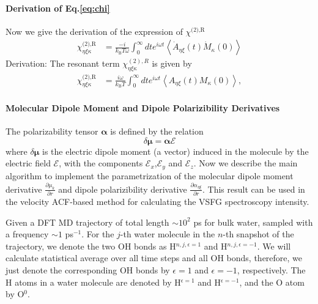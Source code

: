 \paragraph{Derivation of Eq.\space\ref{eq:chi}}
Now we give the derivation of the expression of $\chi^{\text{(2),R}}$
\begin{align}
   \chi^{\text{(2),R}}_{\eta\xi\kappa}&=\frac{-i}{k_{\text{B}}T \omega} \int_0^\infty dt e^{i \omega t}\left\langle \dot{A}_{\eta\xi}(t) \dot{M}_{\kappa}(0)\right\rangle
\end{align}
Derivation: 
The resonant term $\chi^{(2),R}_{\eta\xi\kappa}$ is given by \cite{Morita2008}
\begin{align}
  \chi^{\text{(2),R}}_{\eta\xi\kappa}&=\frac{i\omega}{k_{\text{B}}T} \int_0^\infty dt e^{i \omega t}\left\langle {A}_{\eta\xi}(t) {M}_{\kappa}(0)\right\rangle,
\end{align}

\paragraph{Molecular Dipole Moment and Dipole Polarizibility Derivatives} \label{calculate_derivatives} 

The polarizability tensor $\boldsymbol{\alpha}$ is defined by the relation
\begin{equation}
  \delta \boldsymbol{\mu} = \boldsymbol{\alpha} \boldsymbol{\mathscr{E}}
  \label{eq:def_alpha}
\end{equation}
where $\delta \boldsymbol{\mu}$ is the electric dipole moment (a vector) induced in the molecule by
the electric field $\boldsymbol{\mathscr{E}}$, with the components $\mathscr{E}_x$,$\mathscr{E}_y$ and $\mathscr{E}_z$.
Now we describe the main algorithm to implement the parametrization of the molecular dipole moment 
derivative $\frac{\partial \mu_k}{\partial r}$ and dipole polarizibility derivative $\frac{\partial\alpha_{\eta\xi}}{\partial r}$. 
This result can be used in the velocity ACF-based method for calculating the VSFG spectroscopy intensity.

Given a DFT MD trajectory of total length $\sim 10^2$ ps for bulk water, sampled with a frequency $\sim 1$ ps$^{-1}$.
For the $j$-th water molecule in the $n$-th snapshot of the trajectory, 
we denote the two OH bonds as H$^{n,j,\epsilon=1}$ and H$^{n,j,\epsilon=-1}$. We will calculate statistical average over all time steps and all OH bonds, therefore, 
we just denote the corresponding OH bonds by ${\epsilon=1}$ and ${\epsilon=-1}$, respectively. 
The H atoms in a water molecule are denoted by H$^{\epsilon=1}$ and H$^{\epsilon=-1}$, and the O atom by O$^{0}$.

